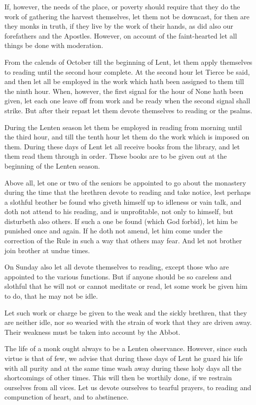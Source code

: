 If, however, the needs of the place, or poverty should require that they do the work of gathering the harvest themselves, let them not be downcast, for then are they monks in truth, if they live by the work of their hands, as did also our forefathers and the Apostles. However, on account of the faint-hearted let all things be done with moderation.

From the calends of October till the beginning of Lent, let them apply themselves to reading until the second hour complete. At the second hour let Tierce be said, and then let all be employed in the work which hath been assigned to them till the ninth hour. When, however, the first signal for the hour of None hath been given, let each one leave off from work and be ready when the second signal shall strike. But after their repast let them devote themselves to reading or the psalms.

During the Lenten season let them be employed in reading from morning until the third hour, and till the tenth hour let them do the work which is imposed on them. During these days of Lent let all receive books from the library, and let them read them through in order. These books are to be given out at the beginning of the Lenten season.

Above all, let one or two of the seniors be appointed to go about the monastery during the time that the brethren devote to reading and take notice, lest perhaps a slothful brother be found who giveth himself up to idleness or vain talk, and doth not attend to his reading, and is unprofitable, not only to himself, but disturbeth also others. If such a one be found (which God forbid), let him be punished once and again. If he doth not amend, let him come under the correction of the Rule in such a way that others may fear. And let not brother join brother at undue times.

On Sunday also let all devote themselves to reading, except those who are appointed to the various functions. But if anyone should be so careless and slothful that he will not or cannot meditate or read, let some work be given him to do, that he may not be idle.

Let such work or charge be given to the weak and the sickly brethren, that they are neither idle, nor so wearied with the strain of work that they are driven away. Their weakness must be taken into account by the Abbot.


The life of a monk ought always to be a Lenten observance. However, since such virtue is that of few, we advise that during these days of Lent he guard his life with all purity and at the same time wash away during these holy days all the shortcomings of other times. This will then be worthily done, if we restrain ourselves from all vices. Let us devote ourselves to tearful prayers, to reading and compunction of heart, and to abstinence.

